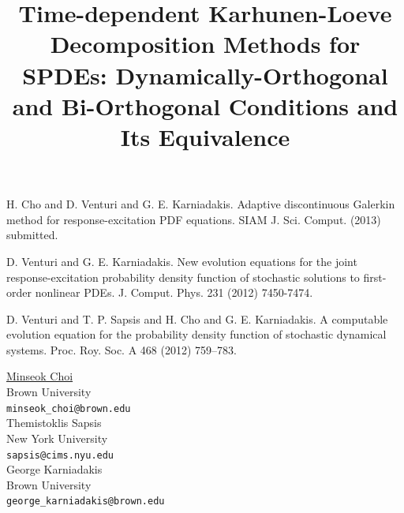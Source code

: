 \documentclass[article, A4, 11pt]{llncs}%
\begin{document}

\begin{thebibliography}{10}
{\sc H. Cho and D. Venturi and G. E. Karniadakis}. {Adaptive discontinuous Galerkin method for response-excitation PDF equations}. SIAM J. Sci. Comput. (2013) submitted.

{\sc D. Venturi and G. E. Karniadakis}. {New evolution equations for the joint response-excitation probability density function of stochastic solutions to first-order nonlinear PDEs}. J. Comput. Phys. 231 (2012) 7450-7474.

{\sc D. Venturi and T. P. Sapsis and H. Cho and G. E. Karniadakis}. {A computable evolution equation for the probability density function of stochastic dynamical systems}. Proc. Roy. Soc. A 468 (2012) 759–783.
\end{thebibliography} %

\title{Time-dependent Karhunen-Loeve Decomposition Methods for SPDEs: Dynamically-Orthogonal and Bi-Orthogonal Conditions and Its Equivalence}
 \author{} \institute{}
\maketitle
\begin{center}
{\large \underline{Minseok Choi}}\\
Brown University\\
{\tt minseok\_choi@brown.edu}
\\ \vspace{4mm}
{\large Themistoklis Sapsis}\\
New York University\\
{\tt sapsis@cims.nyu.edu}
\\ \vspace{4mm}
{\large George Karniadakis}\\
Brown University\\
{\tt george\_karniadakis@brown.edu}
\end{center}
\end{document}
